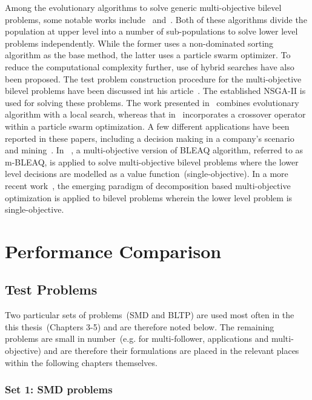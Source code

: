 Among the evolutionary algorithms to solve generic multi-objective bilevel problems, some notable works include~\cite{deb2009solve} and~\cite{carrasqueira2015bi}. Both of these algorithms divide the population at upper level into a number of sub-populations to solve lower level problems independently. While the former uses a non-dominated sorting algorithm as the base method, the latter uses a particle swarm optimizer. To reduce the computational complexity further, use of hybrid searches have also been proposed. The test problem construction procedure for the multi-objective bilevel problems have been discussed int his article~\cite{deb2009constructing}. The established NSGA-II is used for solving these problems. The work presented in~\cite{deb2010efficient} combines evolutionary algorithm with a local search, whereas that in~\cite{zhang2013solving} incorporates a crossover operator within a particle swarm optimization. A few different applications have been reported in these papers, including a decision making in a company's scenario~\cite{zhang2013solving,deb2010efficient} and mining~\cite{sinha2013multi}. In ~\cite{sinha2015towards}, a multi-objective version of BLEAQ algorithm, referred to as m-BLEAQ, is applied to solve multi-objective bilevel problems where the lower level decisions are modelled as a value function~(single-objective). In a more recent work~\cite{li2016multiobjective}, the emerging paradigm of decomposition based multi-objective optimization is applied to bilevel problems wherein the lower level problem is single-objective.



\section{Performance Comparison} 
\label{sec:metrics_ch_2}

\subsection{Test Problems}
\label{sec:test}


Two particular sets of problems~(SMD and BLTP) are used most often in the this thesis~(Chapters 3-5) and are therefore noted below. The remaining problems are small in number~(e.g. for multi-follower, applications and multi-objective) and are therefore their formulations are placed in the relevant places within the following chapters themselves.   

\subsubsection{Set 1: SMD problems}


